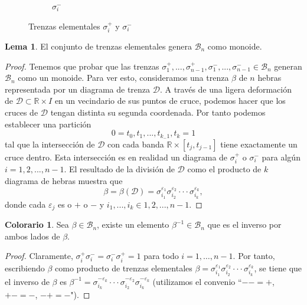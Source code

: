 \documentclass[12pt]{book}
\theoremstyle{definition}
\newtheorem{lema}{Lema}[section]
\newtheorem{colo}{Colorario}[section]
\begin{document}
\begin{figure}[h!]
\begin{subfigure}[b]{0.6\linewidth}
\begin{center}

\caption*{$\sigma_i^-$}
\end{center}
\end{subfigure} 


\caption{Trenzas elementales $\sigma_i^+$ y $\sigma_i^-$}
\label{fig:elem_braids}
\end{figure}


\begin{lema}
El conjunto de trenzas elementales genera $\mathcal{B}_n$ como monoide.
\label{lema:mono_tren}
\end{lema}

\begin{proof}
Tenemos que probar que las trenzas $\sigma_1^+,...,\sigma_{n-1}^+, \sigma_1^-,...,\sigma_{n-1}^-\in\mathcal{B}_n$ generan $\mathcal{B}_n$ como un monoide. Para ver esto, consideramos una trenza $\beta$ de $n$ hebras representada por un diagrama de trenza $\mathcal{D}$. A través de una ligera deformación de $\mathcal{D}\subset\mathbb{R}\times I$ en un vecindario de sus puntos de cruce, podemos hacer que los cruces de $\mathcal{D}$ tengan distinta su segunda coordenada. Por tanto podemos establecer una partición
$$0=t_0,t_1,...,t_{k_-1},t_k = 1$$
tal que la intersección de $\mathcal{D}$ con cada banda $\mathbb{R}\times[t_j, t_{j-1}]$ tiene exactamente un cruce dentro. Esta intersección es en realidad un diagrama de $\sigma_i^+$ o $\sigma_i^-$ para algún $i = 1,2,...,n-1$. El resultado de la división de $\mathcal{D}$ como el producto de $k$ diagrama de hebras muestra que
$$\beta = \beta(\mathcal{D}) = \sigma_{i_1}^{\varepsilon_1}\sigma_{i_2}^{\varepsilon_2}\cdot\cdot\cdot\sigma_{i_k}^{\varepsilon_k},$$
donde cada $\varepsilon_j$ es o $+$ o $-$ y $i_1,...,i_k\in{1,2,...,n-1}$.

\end{proof}

\begin{colo}
\label{lema:inverso}
Sea $\beta\in\mathcal{B}_n$, existe un elemento $\beta^{-1}\in\mathcal{B}_n$ que es el inverso por ambos lados de $\beta$.
\end{colo}
\begin{proof}
Claramente, $\sigma_i^+\sigma_i^- = \sigma_i^-\sigma_i^+=1$ para todo $i=1,\ldots,n-1$. Por tanto, escribiendo $\beta$ como producto de trenzas elementales $\beta = \sigma_{i_1}^{\varepsilon_1}\sigma_{i_2}^{\varepsilon_2}\cdot\cdot\cdot\sigma_{i_k}^{\varepsilon_k}$, se tiene que el inverso de $\beta$ es $\beta^{-1} = \sigma_{i_k}^{-\varepsilon_k}\cdot\cdot\cdot\sigma_{i_2}^{-\varepsilon_2}\sigma_{i_k}^{-\varepsilon_k}$ (utilizamos el convenio ``$--=+$, $+-=-$, $-+=-$").
 \end{proof}
\end{document}

